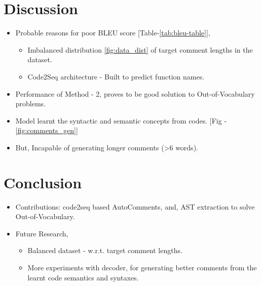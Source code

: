 \documentclass{tudelftposter}
\begin{document}
\section{Discussion}
\begin{itemize}
    \item Probable reasons for poor BLEU score [Table-\ref{tab:bleu-table}],
        \begin{itemize}
            \item Imbalanced distribution \ref{fig:data_dist} of target comment lengths in the dataset.
            \item Code2Seq architecture - Built to predict function names.
        \end{itemize}
    \item Performance of Method - 2, proves to be good solution to Out-of-Vocabulary problems.
    \item Model learnt the syntactic and semantic concepts from codes. [Fig - \ref{fig:comments_gen}]
    \item But, Incapable of generating longer comments (>6 words).
\end{itemize}

\section{Conclusion}
\begin{itemize}
    \item Contributions: code2seq based AutoComments, and, AST extraction to solve Out-of-Vocabulary.
    \item Future Research,
    \begin{itemize}
        \item Balanced dataset - w.r.t. target comment lengths.
        \item More experiments with decoder, for generating better comments from the learnt code semantics and syntaxes.
    \end{itemize}
\end{itemize}
\end{document}
